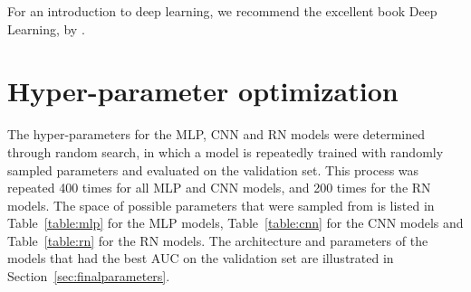 \documentclass[preprint]{elsarticle}
\begin{document}
For an introduction to deep learning, we recommend the excellent book Deep Learning, by \citet{goodfellow2016}.

\section{Hyper-parameter optimization}
The hyper-parameters for the MLP, CNN and RN models were determined through random search, in which a model is repeatedly trained with randomly sampled parameters and evaluated on the validation set. This process was repeated 400 times for all MLP and CNN models, and 200 times for the RN models. The space of possible parameters that were sampled from is listed in Table~\ref{table:mlp} for the MLP models, Table~\ref{table:cnn} for the CNN models and Table~\ref{table:rn} for the RN models. The architecture and parameters of the models that had the best AUC on the validation set are illustrated in Section~\ref{sec:finalparameters}. 

\end{document}
